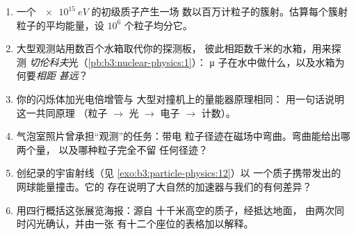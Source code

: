 \begin{problem}
\begin{enumerate}[resume]
  \item 一个 $\qty{e15}{eV}$ 的初级质子产生一场
        数以百万计粒子的簇射。估算每个簇射
        粒子的平均能量，设 $10^{6}$ 个粒子均分它。
  \item 大型观测站用数百个水箱取代你的探测板，
        彼此相距数千米的水箱，用来探测
        \emph{切伦科夫}光（\cref{pb:b3:nuclear-physics:1}）：
        μ 子在水中做什么，以及水箱为何要\emph{相距
        甚远}？
  \item 你的闪烁体加光电倍增管与
        大型对撞机上的量能器原理相同：
        用一句话说明这一共同原理
        （粒子 $\to$ 光 $\to$ 电子 $\to$ 计数）。
  \item 气泡室照片曾承担“观测”的任务：带电
        粒子径迹在磁场中弯曲。弯曲能给出哪两个量，
        以及哪种粒子完全不留
        任何径迹？
  \item 创纪录的宇宙射线（见
        \cref{exo:b3:particle-physics:12}）以
        一个质子携带发出的网球能量撞击。它的
        存在说明了大自然的加速器与我们的有何差异？
  \item 用四行概括这张展览海报：源自
        十千米高空的质子，经抵达地面，
        由两次同时闪光确认，并由一张
        有十二个座位的表格加以解释。
\end{enumerate}
\end{problem}
